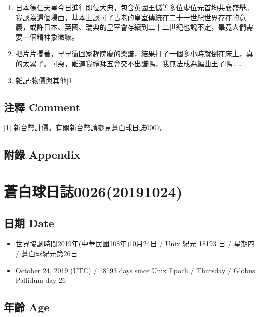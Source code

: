 \documentclass[a5paper, 12pt
]{book}
\providecommand{\tightlist}{%
  \setlength{\itemsep}{0pt}\setlength{\parskip}{0pt}}
\begin{document}
\begin{enumerate}
\def\labelenumi{\arabic{enumi}.}
\item
  日本德仁天皇今日進行即位大典，包含英國王儲等多位虛位元首均共襄盛舉。我認為這個場面，基本上認可了古老的皇室傳統在二十一世紀世界存在的意義，或許日本、英國、瑞典的皇室會存續到二十二世紀也說不定，畢竟人們需要一個精神象徵嘛。
\item
  把片片擱著，早早衝回家趕院慶的樂譜，結果打了一個多小時就倒在床上，真的太累了。可惡，難道我禮拜五會交不出譜嗎，我無法成為編曲王了嗎\ldots\ldots{}
\item
  雜記:物價與其他{[}1{]}
\end{enumerate}

\hypertarget{ux6ce8ux91cb-comment-18}{%
\subsection{注釋 Comment}\label{ux6ce8ux91cb-comment-18}}

{[}1{]} 新台幣計價。有關新台幣請參見蒼白球日誌0007。

\hypertarget{ux9644ux9304-appendix-17}{%
\subsection{附錄 Appendix}\label{ux9644ux9304-appendix-17}}

\hypertarget{ux84bcux767dux7403ux65e5ux8a8c002620191024}{%
\section{蒼白球日誌0026(20191024)}\label{ux84bcux767dux7403ux65e5ux8a8c002620191024}}

\hypertarget{ux65e5ux671f-date-25}{%
\subsection{日期 Date}\label{ux65e5ux671f-date-25}}

\begin{itemize}
\tightlist
\item
  世界協調時間2019年(中華民國108年)10月24日 / Unix 紀元 18193 日 /
  星期四 / 蒼白球紀元第26日
\item
  October 24, 2019 (UTC) / 18193 days since Unix Epoch / Thursday /
  Globus Pallidum day 26
\end{itemize}

\hypertarget{ux5e74ux9f61-age-25}{%
\subsection{年齡 Age}\label{ux5e74ux9f61-age-25}}
\end{document}
